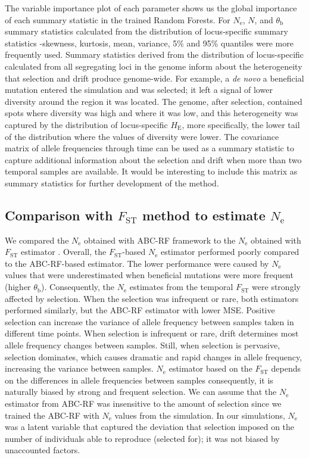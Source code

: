 \documentclass[a4paper, 12pt]{article}
\begin{document}
The variable importance plot of each parameter shows us the global importance of each summary statistic in the trained Random Forests. For $N_{\mathrm{e}}$, $N$, and $\theta_{\mathrm{b}}$ summary statistics calculated from the distribution of locus-specific summary statistics -skewness, kurtosis, mean, variance, 5\% and 95\% quantiles were more frequently used. Summary statistics derived from the distribution of locus-specific calculated from all segregating loci in the genome inform about the heterogeneity that selection and drift produce genome-wide. For example, a \textit{de novo} a beneficial mutation entered the simulation and was selected; it left a signal of lower diversity around the region it was located. The genome, after selection, contained spots where diversity was high and where it was low, and this heterogeneity was captured by the distribution of locus-specific $H_{\mathrm{E}}$, more specifically, the lower tail of the distribution where the values of diversity were lower. The covariance matrix of allele frequencies through time \citep{Buffalo:2020hq} can be used as a summary statistic to capture additional information about the selection and drift when more than two temporal samples are available. It would be interesting to include this matrix as summary statistics for further development of the method.

\subsection*{Comparison with $F_{\mathrm{ST}}$ method to estimate $N_\mathrm{e}$}

We compared the $N_{\mathrm{e}}$ obtained with ABC-RF framework to the $N_{\mathrm{e}}$ obtained with $F_{\mathrm{ST}}$ estimator \citep{Frachon:2017fw}. Overall, the $F_{\mathrm{ST}}$-based $N_{\mathrm{e}}$ estimator performed poorly compared to the ABC-RF-based estimator. The lower performance were caused by $N_{\mathrm{e}}$ values that were underestimated when beneficial mutations were more frequent (higher $\theta_{\mathrm{b}}$). Consequently, the $N_{\mathrm{e}}$ estimates from the temporal $F_{\mathrm{ST}}$ were strongly affected by selection. When the selection was infrequent or rare, both estimators performed similarly, but the ABC-RF estimator with lower MSE. Positive selection can increase the variance of allele frequency between samples taken in different time points. When selection is infrequent or rare, drift determines most allele frequency changes between samples. Still, when selection is pervasive, selection dominates, which causes dramatic and rapid changes in allele frequency, increasing the variance between samples. $N_{\mathrm{e}}$ estimator based on the $F_{\mathrm{ST}}$ depends on the differences in allele frequencies between samples consequently, it is naturally biased by strong and frequent selection. We can assume that the $N_{\mathrm{e}}$ estimator from ABC-RF was insensitive to the amount of selection since we trained the ABC-RF with $N_{\mathrm{e}}$ values from the simulation. In our simulations, $N_{\mathrm{e}}$ was a latent variable that captured the deviation that selection imposed on the number of individuals able to reproduce (selected for); it was not biased by unaccounted factors. 
\end{document}
